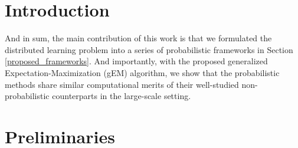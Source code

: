 \documentclass{article}
\newcommand{\1}[0]{\ensuremath{\boldsymbol{1}}\xspace}
\begin{document}

\begin{abstract} 

\end{abstract} 

\section{Introduction}

And in sum, the main contribution of this work is that we formulated the distributed learning problem into a series of probabilistic frameworks in Section \ref{proposed_frameworks}. And importantly, with the proposed generalized Expectation-Maximization (gEM) algorithm, we show that the probabilistic methods share similar computational merits of their well-studied non-probabilistic counterparts in the large-scale setting.

\section{Preliminaries}
\end{document}
